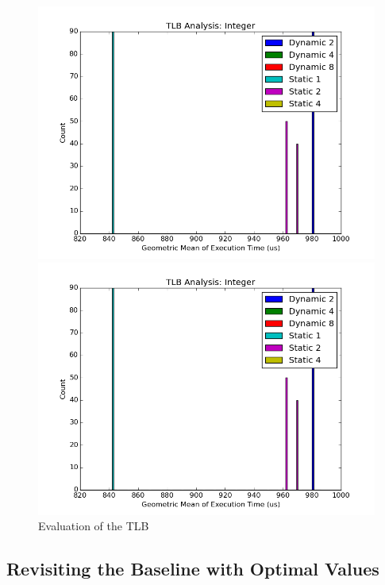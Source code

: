 \documentclass[paper=a4, fontsize=12pt]{scrartcl} %
\numberwithin{equation}{section} %
\numberwithin{figure}{section} %
\numberwithin{table}{section} %
\begin{document}
\begin{figure}
\centering
\begin{minipage}{0.5\textwidth}
\centering
	\includegraphics[width=\linewidth]{graphs/TLB/TLB_Analysis_Integer.png}
\end{minipage}\hfill
\begin{minipage}{0.5\textwidth}
\centering
 \includegraphics[width=\linewidth]{graphs/TLB/TLB_Analysis_Integer.png}
\end{minipage}

\caption{Evaluation of the TLB}
\label{fig:tlb}
\end{figure}


\subsection{Revisiting the Baseline with Optimal Values}
\end{document}
